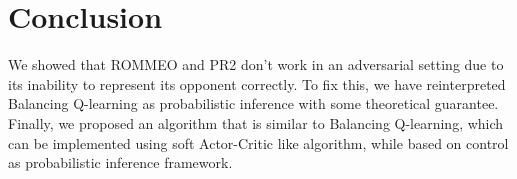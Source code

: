 \section{Conclusion}
We showed that ROMMEO and PR2 don't work in an adversarial setting due to its inability to represent its opponent correctly. To fix this, we have reinterpreted Balancing Q-learning as probabilistic inference with some theoretical guarantee. Finally, we proposed an algorithm that is similar to Balancing Q-learning, which can be implemented using soft Actor-Critic like algorithm, while based on control as probabilistic inference framework. 

% 